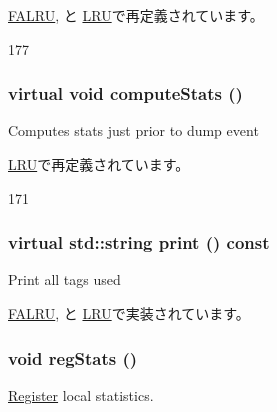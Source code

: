 \hyperlink{classFALRU_a522e7dda9c2f4eba2cc1c103887d9265}{FALRU}, と \hyperlink{classLRU_a522e7dda9c2f4eba2cc1c103887d9265}{LRU}で再定義されています。


\begin{DoxyCode}
177 {}
\end{DoxyCode}
\hypertarget{classBaseTags_a23fd48fae3a5efe5e8ffbefb54e51c1c}{
\subsubsection[{computeStats}]{\setlength{\rightskip}{0pt plus 5cm}virtual void computeStats ()}}
\label{classBaseTags_a23fd48fae3a5efe5e8ffbefb54e51c1c}
Computes stats just prior to dump event 

\hyperlink{classLRU_a7dd045727ced6181c74934442e2ca33d}{LRU}で再定義されています。


\begin{DoxyCode}
171 {}
\end{DoxyCode}
\hypertarget{classBaseTags_a56a7c10391fb704ea26efc16f4f4f87b}{
\subsubsection[{print}]{\setlength{\rightskip}{0pt plus 5cm}virtual std::string print () const}}
\label{classBaseTags_a56a7c10391fb704ea26efc16f4f4f87b}
Print all tags used 

\hyperlink{classFALRU_ac07d4bdf71f061cd9dba907c905a9543}{FALRU}, と \hyperlink{classLRU_ae8a5b5e9e0e6be3b115ee77fa7b4d0c8}{LRU}で実装されています。\hypertarget{classBaseTags_a4dc637449366fcdfc4e764cdf12d9b11}{
\subsubsection[{regStats}]{\setlength{\rightskip}{0pt plus 5cm}void regStats ()}}
\label{classBaseTags_a4dc637449366fcdfc4e764cdf12d9b11}
\hyperlink{classRegister}{Register} local statistics. 

